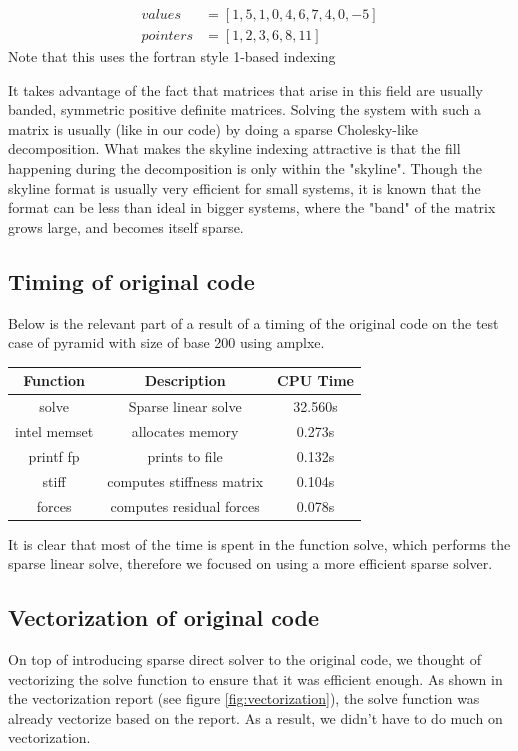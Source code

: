 \documentclass[11pt]{article}
\begin{document}
\begin{align}
values&=[1,5,1,0,4,6,7,4,0,-5]\\
pointers&= [1,2,3,6,8,11] 
\end{align}
Note that this uses the fortran style 1-based indexing

 It takes advantage of the fact that matrices that arise in this field are usually banded, symmetric positive definite matrices. Solving the system with such a matrix is usually (like in our code) by doing a sparse Cholesky-like decomposition. What makes the skyline indexing attractive is that the fill happening during the decomposition is only within the "skyline".
Though the skyline format is usually very efficient for small systems, it is known that the format can be less than ideal in bigger systems, where the "band" of the matrix grows large, and becomes itself  sparse.


\subsection{Timing of original code}

Below is the relevant part of a result of a timing of the original code on the test case of pyramid with size of base 200 using amplxe.
\begin{center}
 \begin{tabular}{||c c c ||} 
 \hline
 Function & Description & CPU Time \\ [0.5ex] 
 \hline\hline
 solve & Sparse linear solve & 32.560s  \\ 
 \hline
 intel memset  & allocates memory & 0.273s  \\
 \hline
 printf fp & prints to file & 0.132s  \\
 \hline
 stiff & computes stiffness matrix & 0.104s  \\
 \hline
  forces & computes residual forces & 0.078s  \\[1ex] 
 \hline
\end{tabular}
\end{center}

It is clear that most of the time is spent in the function solve, which performs the sparse linear solve, therefore we focused on using a more efficient sparse solver.


\subsection{Vectorization of original code}
On top of introducing sparse direct solver to the original code, we thought of vectorizing the solve function to ensure that it was efficient enough. As shown in the vectorization report (see figure \ref{fig:vectorization}), the solve function was already vectorize based on the report. As a result, we didn't have to do much on vectorization. 
\end{document}
